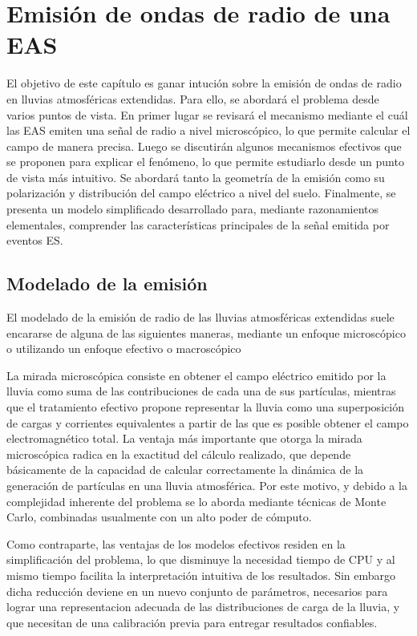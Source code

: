 \chapter{Emisi\'on de ondas de radio de una EAS}
\label{ch:easRadio}

El objetivo de este cap\'itulo es ganar intuci\'on sobre la emisión de ondas de radio en lluvias atmosféricas extendidas.
Para ello, se abordar\'a el problema desde varios puntos de vista.
En primer lugar se revisar\'a el mecanismo mediante el cu\'al las EAS emiten una se\~nal de radio a nivel microsc\'opico, lo que permite calcular el campo de manera precisa. 
Luego se discutir\'an algunos mecanismos efectivos que se proponen para explicar el fen\'omeno, lo que permite estudiarlo desde un punto de vista m\'as intuitivo.
Se abordar\'a tanto la geometr\'ia de la emisi\'on como su polarizaci\'on y distribuci\'on del campo el\'ectrico a nivel del suelo.
Finalmente, se presenta un modelo simplificado desarrollado para, mediante razonamientos elementales, comprender las caracter\'isticas principales de la se\~nal emitida por eventos ES.

\section{Modelado de la emisi\'on}
\label{sc:gen_emision}

El modelado de la emisi\'on de radio de las lluvias atmosf\'ericas extendidas suele encararse de alguna de las siguientes maneras, mediante un enfoque microsc\'opico o utilizando un enfoque efectivo o macrosc\'opico

La mirada microsc\'opica consiste en obtener el campo el\'ectrico emitido por la lluvia como suma de las contribuciones de cada una de sus part\'iculas, mientras que el tratamiento efectivo propone representar la lluvia como una superposici\'on de cargas y corrientes equivalentes a partir de las que es posible obtener el campo electromagn\'etico total.
La ventaja m\'as importante que otorga la mirada microsc\'opica radica en la exactitud del c\'alculo realizado, que depende b\'asicamente de la capacidad de calcular correctamente la din\'amica de la generaci\'on de part\'iculas en una lluvia atmosf\'erica.
Por este motivo, y debido a la complejidad inherente del problema se lo aborda mediante t\'ecnicas de Monte Carlo, combinadas usualmente con un alto poder de c\'omputo.

Como contraparte, las ventajas de los modelos efectivos residen en la simplificaci\'on del problema, lo que disminuye la necesidad tiempo de CPU y al mismo tiempo facilita la interpretaci\'on intuitiva de los resultados. 
Sin embargo dicha reducci\'on deviene en un nuevo conjunto de par\'ametros, necesarios para lograr una representacion adecuada de las distribuciones de carga de la lluvia, y que necesitan de una calibraci\'on previa para entregar resultados confiables.

